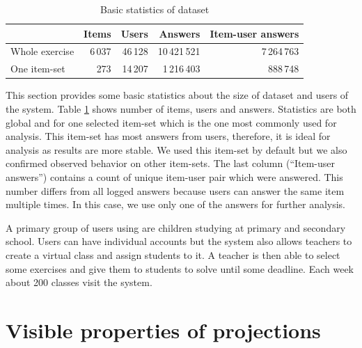 \documentclass[
  digital, %
  table,   %
  nolof,     %
  nolot,     %
  nocover,
  color,
  final, %
]{fithesis3}
\begin{document}
\begin{table}
  \begin{tabular}{|l|r r r r|}
    \hline
     & Items & Users & Answers & Item-user answers \\
    \hline\hline
    Whole exercise & 6\,037 & 46\,128 & 10\,421\,521 & 7\,264\,763 \\
    \hline
    One item-set & 273 & 14\,207 & 1\,216\,403 & 888\,748 \\
    \hline
  \end{tabular}
  \caption{Basic statistics of dataset}
  \label{tab:basic-statistics}
\end{table}

This section provides some basic statistics about the size of dataset and users of the system. Table \ref{tab:basic-statistics} shows number of items, users and answers. Statistics are both global and for one selected item-set which is the one most commonly used for analysis. This item-set has most answers from users, therefore, it is ideal for analysis as results are more stable. We used this item-set by default but we also confirmed observed behavior on other item-sets. The last column (``Item-user answers'') contains a count of unique item-user pair which were answered. This number differs from all logged answers because users can answer the same item multiple times. In this case, we use only one of the answers for further analysis.


A primary group of users using \umimeCesky{} are children studying at primary and secondary school. Users can have individual accounts
but the system also allows teachers to create a virtual class and assign students to it. A teacher is then able to select some exercises and give them to students to solve until some deadline. Each week about 200 classes visit the system.



\section{Visible properties of projections}\label{visible-properties-of-projections}
\end{document}
